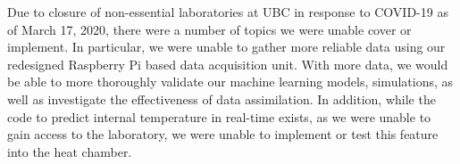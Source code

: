 Due to closure of non-essential laboratories at UBC in response to COVID-19 as of March 17, 2020, there were a number of topics we were unable cover or implement. In particular, we were unable to gather more reliable data using our redesigned  Raspberry Pi based data acquisition unit. With more data, we would be able to more thoroughly validate our machine learning models, simulations, as well as investigate the effectiveness of data assimilation. In addition, while the code to predict internal temperature in real-time exists, as we were unable to gain access to the laboratory, we were unable to implement or test this feature into the heat chamber.